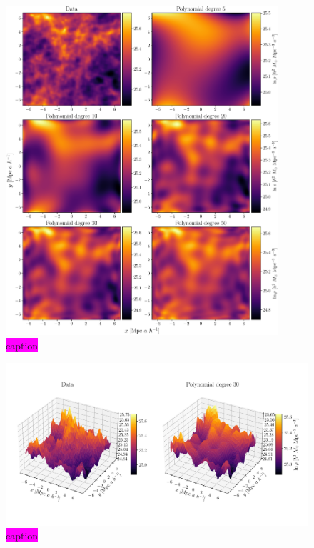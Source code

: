 \documentclass[aps,pra,english,notitlepage,reprint,nofootinbib]{revtex4-1}  %
\begin{document}
\begin{figure}
  \vspace*{-5pt}
  \centering %
  \includegraphics[width=0.9\textwidth]{../figs/density_complexity.pdf}
  \caption{\colorbox{magenta}{caption}}\label{fig:density complexity}
  \vspace*{-5pt}
\end{figure}

\begin{figure}
  \vspace*{-5pt}
  \centering %
  \includegraphics[width=\textwidth]{../figs/density_surf.pdf}
  \caption{\colorbox{magenta}{caption}}\label{fig:density surf}
  \vspace*{-5pt}
\end{figure}
\end{document}
